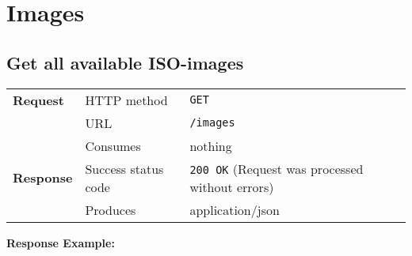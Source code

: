 \section{Images} %

\subsection{Get all available ISO-images} %

\begin{center}
	\begin{tabularx}{\textwidth}{llX} 
	    \toprule
					\textbf{Request}        &   HTTP method             &   \texttt{GET}			\tabularnewline
		                        			&   URL                     &   \texttt{/images}           	\tabularnewline
                                  &   Consumes                &   nothing					      	\tabularnewline \midrule                       
          \textbf{Response}       &   Success status code     &   \texttt{200 OK} (Request was processed without errors) 	\tabularnewline
                                  &   Produces                &   application/json								\tabularnewline
           \bottomrule
	\end{tabularx}
\end{center}
\pagebreak[3] 	
\pagebreak[3]
		\textbf{Response Example:}
		




